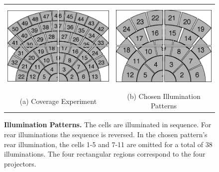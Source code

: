 \begin{figure}
\centering
\begin{tabular}{cc}
\includegraphics[height=1.7in]{figures_pami/coverage_experiment_asplode.png} &
\includegraphics[height=1.7in]{figures_pami/final_cvpr_illuminations_asplode.png}  \\
(a) Coverage Experiment & (b) Chosen Illumination Patterns
\end{tabular}
\caption{\small{\bf Illumination Patterns.}   The cells are illuminated in
sequence.  For rear illuminations the sequence is reversed.  In the chosen
pattern's rear illumination, the cells 1-5 and 7-11 are omitted for a total of
38 illuminations. The four rectangular regions correspond to the four
projectors.  }
\label{fig:illumination-patterns}
\end{figure}

